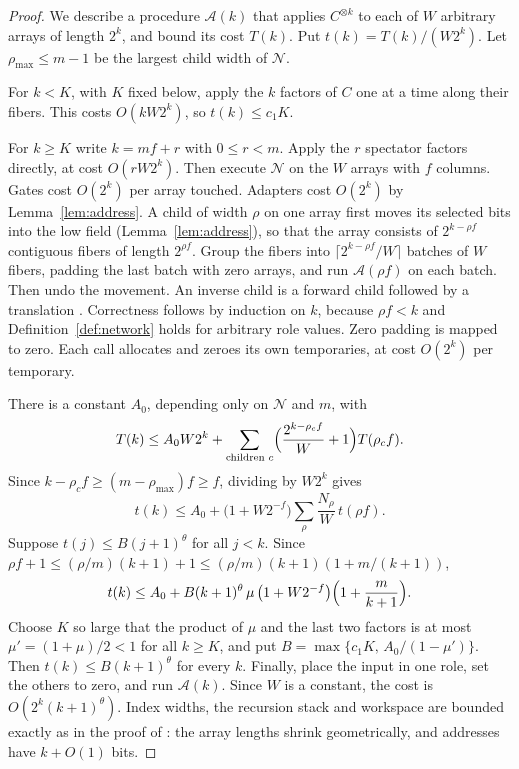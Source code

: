 \documentclass[11pt]{article}
\theoremstyle{definition}
\begin{document}
\begin{proof}
We describe a procedure $\mathcal A(k)$ that applies $C^{\otimes k}$ to each of
$W$ arbitrary arrays of length $2^k$, and bound its cost $T(k)$. Put
$t(k)=T(k)/(W2^k)$. Let $\rho_{\max}\le m-1$ be the largest child width
of $\mathcal N$.

For $k<K$, with $K$ fixed below, apply the $k$ factors of $C$ one at a time
along their fibers. This costs $O(kW2^k)$, so $t(k)\le c_1K$.

For $k\ge K$ write $k=mf+r$ with $0\le r<m$. Apply the $r$ spectator factors
directly, at cost $O(rW2^k)$. Then execute $\mathcal N$ on the $W$ arrays with
$f$ columns. Gates cost $O(2^k)$ per array touched. Adapters cost $O(2^k)$ by
Lemma~\ref{lem:address}. A child of width $\rho$ on one array first moves its
selected bits into the low field (Lemma~\ref{lem:address}), so that the array
consists of $2^{k-\rho f}$ contiguous fibers of length $2^{\rho f}$. Group the
fibers into $\lceil2^{k-\rho f}/W\rceil$ batches of $W$ fibers, padding the last
batch with zero arrays, and run $\mathcal A(\rho f)$ on each batch. Then undo the
movement. An inverse child is a forward child followed by a translation
\cite[Lemma~2.2]{oai-dft}. Correctness follows by induction on $k$, because
$\rho f<k$ and Definition~\ref{def:network} holds for arbitrary role values.
Zero padding is mapped to zero. Each call allocates and zeroes its own
temporaries, at cost $O(2^k)$ per temporary.

There is a constant $A_0$, depending only on $\mathcal N$ and $m$, with
\[
 T(k)\le A_0W2^k+\sum_{\text{children }c}
   \Bigl(\frac{2^{k-\rho_cf}}{W}+1\Bigr)T(\rho_cf).
\]
Since $k-\rho_cf\ge(m-\rho_{\max})f\ge f$, dividing by $W2^k$ gives
\[
 t(k)\le A_0+\bigl(1+W2^{-f}\bigr)\sum_\rho\frac{N_\rho}{W}\,t(\rho f).
\]
Suppose $t(j)\le B(j+1)^\theta$ for all $j<k$. Since
$\rho f+1\le(\rho/m)(k+1)+1\le(\rho/m)(k+1)(1+m/(k+1))$,
\[
 t(k)\le A_0+B(k+1)^\theta\,\mu\,\bigl(1+W2^{-f}\bigr)\Bigl(1+\frac m{k+1}\Bigr).
\]
Choose $K$ so large that the product of $\mu$ and the last two factors is at most
$\mu'=(1+\mu)/2<1$ for all $k\ge K$, and put
$B=\max\{c_1K,\,A_0/(1-\mu')\}$. Then $t(k)\le B(k+1)^\theta$ for every $k$.
Finally, place the input in one role, set the others to zero, and run
$\mathcal A(k)$. Since $W$ is a constant, the cost is $O(2^k(k+1)^\theta)$.
Index widths, the recursion stack and workspace are bounded exactly as in the
proof of \cite[Theorem~2.6]{oai-dft}: the array lengths shrink geometrically,
and addresses have $k+O(1)$ bits.
\end{proof}
\end{document}
